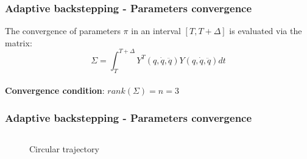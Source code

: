 %
\begin{frame}
\frametitle{Adaptive backstepping - Parameters convergence}
The convergence of parameters $\pi$ in an interval $[T, T+\Delta]$ is evaluated via the matrix:
\begin{equation*}
\Sigma = \int_{T}^{T+\Delta}Y^T(q,\dot{q},\ddot{q})Y(q,\dot{q},\ddot{q})dt
\end{equation*}\\[8pt]
\textbf{Convergence condition}: $rank(\Sigma) = n = 3$
\end{frame}
%
\begin{frame}
\frametitle{Adaptive backstepping - Parameters convergence}
	\begin{columns}
	\begin{column}{0.5\textwidth}
	\begin{figure}
	\captionsetup{labelformat=empty}
	\caption{Circular trajectory}
	\end{figure}
	\end{column}
	\begin{column}{0.5\textwidth}
	\begin{figure}

\end{figure}
\end{column}
\end{columns}
\end{frame}
